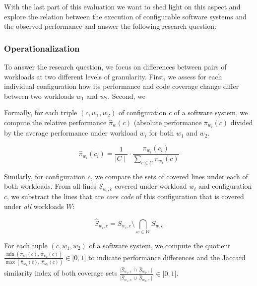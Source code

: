 With the last part of this evaluation we want to shed light on this aspect and explore the relation between the execution of configurable software systems and the observed performance and answer the following research question:


\subsubsection{Operationalization}
To answer the research question, we focus on differences between pairs of workloads at two different levels of granularity. First, we assess for each individual configuration how its performance and code coverage change differ between two workloads $w_1$ and $w_2$. Second, we  

Formally, for each triple $(c, w_1, w_2)$ of configuration $c$ of a software system, we compute the relative performance $\hat{\pi}_{w}(c)$ (absolute performance $\pi_{w_i}(c)$ divided by the average performance under workload $w_i$ for both $w_1$ and $w_2$. 

\begin{equation}
	\hat{\pi}_{w_i}(c_i) =  \frac{1}{\mid C \mid} \cdot \frac{\pi_{w_i}(c_i)}{\sum_{c\in C} \pi_{w_i}(c)}
\end{equation}

Similarly, for configuration $c$, we compare the sets of covered lines under each of both workloads. From all lines $S_{w_i, c}$ covered under workload $w_i$ and configuration $c$, we substract the lines that are \emph{core code} of this configuration that is covered under \emph{all} workloads $W$:

\begin{equation}
\hat{S}_{w_i, c}	 = S_{w_i, c} \setminus \bigcap_{w\in W} S_{w, c}
\end{equation}

For each tuple $(c, w_1, w_2)$ of a software system, we compute the quotient $\frac{ \min(\hat{\pi}_{w_1}(c),~ \hat{\pi}_{w_2}(c)) }{ \max(\hat{\pi}_{w_1}(c),~\hat{\pi}_{w_2}(c)) } \in \lbrack 0,1\rbrack$ to indicate performance differences and the Jaccard similarity index of both coverage sets $\frac{\mid\hat{S}_{w_1, c}~\cap~ \hat{S}_{w_2, c}\mid}{\mid\hat{S}_{w_1, c}~\cup~\hat{S}_{w_2, c}\mid} \in \lbrack 0,1 \rbrack$.

